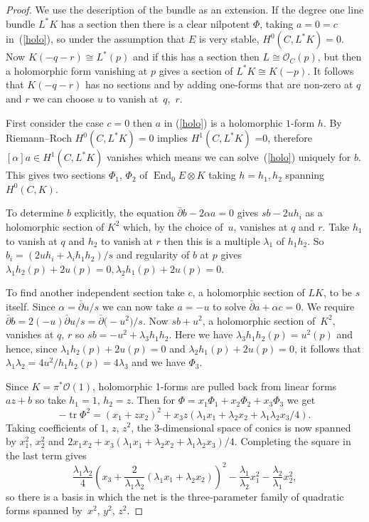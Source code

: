 \documentclass[pdftex]{sigma}
\numberwithin{equation}{section}
\begin{document}
\begin{proof}
We use the description of the bundle as an extension. If the degree one line bundle $L^*K$ has a section then there is a clear nilpotent $\Phi$, taking $a=0=c$ in~(\ref{holo}), so under the assumption that $E$ is very stable, $H^0(C,L^*K)=0$. Now $K(-q-r)\cong L^*(p)$ and if this has a section then $L\cong \mathcal{O}_C(p)$, but then a holomorphic form vanishing at $p$ gives a section of $L^*K\cong K(-p)$. It follows that $K(-q-r)$ has no sections and by adding one-forms that are non-zero at $q$ and $r$ we can choose $u$ to vanish at~$q$,~$r$.

First consider the case $c=0$ then $a$ in (\ref{holo}) is a holomorphic $1$-form $h$. By Riemann--Roch $H^0(C,L^*K)=0$ implies $H^1(C,L^*K)$ =0, therefore $[\alpha] a\in H^1(C,L^*K)$ vanishes which means we can solve~(\ref{holo}) uniquely for $b$. This gives two sections $\Phi_1$, $\Phi_2$ of $\operatorname{End}_0E\otimes K$ taking $h=h_1,h_2$ spanning~$H^0(C,K)$.

To determine $b$ explicitly, the equation $\bar\partial b - 2\alpha a=0$ gives $sb-2uh_i$ as a holomorphic section of $K^2$ which, by the choice of~$u$, vanishes at $q$ and $r$. Take $h_1$ to vanish at $q$ and $h_2$ to vanish at $r$ then this is a multiple $\lambda_1$ of $h_1h_2$. So $b_i=(2uh_i+\lambda_ih_1h_2)/s$ and regularity of $b$ at $p$ gives $\lambda_1h_2(p)+2u(p)=0, \lambda_2h_1(p)+2u(p)=0$.

To find another independent section
take $c$, a holomorphic section of $LK$, to be $s$ itself.
Since $\alpha=\bar\partial u/s$ we can now take $a= -u$ to solve $\bar\partial a+\alpha c=0$.
We require
$\bar\partial b=2(-u)\bar\partial u/s=\bar\partial\big({-}u^2\big)/s$.
Now $sb+u^2$, a holomorphic section of~$K^2$, vanishes at $q$, $r$ so $sb =-u^2+\lambda_3h_1h_2$. Here we have $\lambda_3h_1h_2(p)=u^2(p)$ and hence, since $\lambda_1h_2(p)+2u(p)=0$ and $\lambda_2h_1(p)+2u(p)=0$,
it follows that $ \lambda_1\lambda_2=4u^2/h_1h_2(p)=4\lambda_3$
and we have $\Phi_3$.

Since $K=\pi^*\mathcal{O}(1)$, holomorphic 1-forms are pulled back from linear forms $az+b$ so take $h_1=1$, $h_2=z$. Then
for $\Phi=x_1\Phi_1+x_2\Phi_2+x_3\Phi_3$ we get
\[
-\operatorname{tr}\Phi^2=(x_1+zx_2)^2+x_3z( \lambda_1x_1+\lambda_2x_2 +\lambda_1\lambda_2x_3/4).
\] Taking coefficients of $1$, $z$, $z^2$, the $3$-dimensional space of conics is now spanned by
$x_1^2$, $x_2^2$ and $2x_1x_2+x_3(\lambda_1x_1+\lambda_2x_2+\lambda_1\lambda_2x_3)/4$.
Completing the square in the last term gives
\[
\frac{\lambda_1\lambda_2}{4}\left(x_3+\frac{2}{\lambda_1\lambda_2}(\lambda_1x_1+\lambda_2x_2)\right)^2-\frac{\lambda_1}{\lambda_2}x_1^2-\frac{\lambda_2}{\lambda_1} x_2^2,
\]
so there is a basis in which the net is the three-parameter family of quadratic forms spanned by~$x^2$, $y^2$, $z^2$.
\end{proof}
\end{document}
